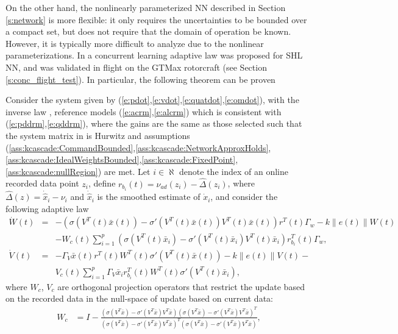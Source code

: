 On the other hand, the nonlinearly parameterized NN described in Section \ref{s:network} is more flexible: it only requires the uncertainties to be bounded over a compact set, but does not require that the domain of operation be known. However, it is typically more difficult to analyze due to the nonlinear parameterizations. In \cite{Chowdhary:JGCD:10} a concurrent learning adaptive law was proposed for SHL NN, and was validated in flight on the GTMax rotorcraft (see Section \ref{s:conc_flight_test}). In particular, the following theorem can be proven~\cite{Chowdhary:JGCD:10,Chowdhary:phd:2010}
\begin{theorem}\label{th:bg_bounded}
    Consider the system given by (\ref{e:pdot},\ref{e:vdot},\ref{e:quatdot},\ref{e:omdot}), with the inverse law , reference models (\ref{e:acrm},\ref{e:alcrm}) which is consistent with (\ref{e:pddrm},\ref{e:qddrm}),  where the gains are the same as those selected such that the system matrix in  is Hurwitz and assumptions (\ref{ass:kcascade:CommandBounded},\ref{ass:kcascade:NetworkApproxHolds},\ref{ass:kcascade:IdealWeightsBounded},\ref{ass:kcascade:FixedPoint},\ref{ass:kcascade:nullRegion}) are met. Let $i \in \aleph$ denote the index of an online recorded data point $z_i$, define $r_{b_i}(t)=\nu_{ad}(z_i)-\hat{\Delta}(z_i)$, where $\hat{\Delta}(z)=\dot{\hat{x}}_i-\nu_i$ and $\dot{\hat{x}}_i$ is the smoothed estimate of $\dot{x}_i$, and consider the following adaptive law
\begin{eqnarray}
    \label{eq:bg_learninglaw}
    \dot W(t) &=&  - (\sigma(V^T(t)\bar{x}(t))  - \sigma '(V^T(t)\bar x(t))V^T(t) \bar x(t))r^T(t) \Gamma _w -k\|e(t)\|W(t) \nonumber \\
    && - W_c(t) \sum\limits_{i = 1}^p {(\sigma(V^T(t)\bar{x}_i)  - \sigma'(V^T(t)\bar{x}_i)V^T(t) \bar x_i )r_{b_i }^T(t) \Gamma _w }, \\
    \dot V(t) &=&  - \Gamma _V \bar x(t)r^T(t) W^T(t) \sigma'(V^T(t)\bar{x}(t)) -k\|e(t)\|V(t) - \nonumber \\
    && V_c(t) \sum\limits_{i = 1}^p {\Gamma _V \bar x_i r_{b_i }^T(t) W^T(t) \sigma '(V^T(t)\bar{x}_i)},
    \end{eqnarray}
where $W_c$, $V_c$ are orthogonal projection operators that restrict the update based on the recorded data in the null-space of update based on current data:
    \begin{align}
\label{eq:WcVc}
    W_c &=I-\frac{(\sigma(V^T\bar{x})  - \sigma '(V^T\bar x)V^T \bar x)(\sigma(V^T\bar{x})  - \sigma '(V^T\bar x)V^T \bar x)^T}{(\sigma(V^T\bar{x})  - \sigma '(V^T\bar x)V^T \bar x)^T(\sigma(V^T\bar{x})  - \sigma '(V^T\bar x)V^T \bar x)},\nonumber \\

\end{align}
\end{theorem}
